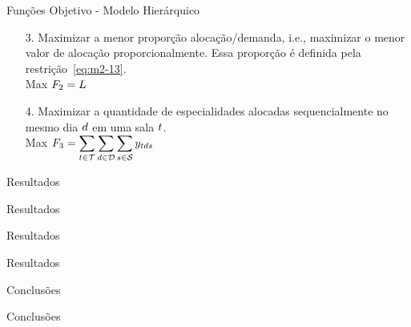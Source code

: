 \documentclass[10pt]{beamer}
\begin{document}
\begin{frame}{Funções Objetivo - Modelo Hierárquico}
    \begin{enumerate}
        \setlength\itemsep{2em}
        \item[3.] Maximizar a menor proporção alocação/demanda, i.e., maximizar o menor valor de alocação proporcionalmente. Essa proporção é definida pela restrição~\ref{eq:m2-13}.\\
        \vspace{0.5em}  
        Max $\displaystyle F_2 = L$

        \item[4.] Maximizar a quantidade de especialidades alocadas sequencialmente no mesmo dia $d$ em uma sala $t$.\\
        \vspace{0.5em}
        Max $\displaystyle F_3 = \sum_{t \in \mathcal{T}} \sum_{d \in \mathcal{D}} \sum_{s \in \mathcal{S}} y_{tds}$
    \end{enumerate}
\end{frame}


\begin{frame}{Resultados}
\end{frame}


\begin{frame}{Resultados}
\end{frame}


\begin{frame}{Resultados}
\end{frame}

\begin{frame}{Resultados}
\end{frame}

\begin{frame}{Conclusões}
\end{frame}

\begin{frame}{Conclusões}
\end{frame}
\end{document}
